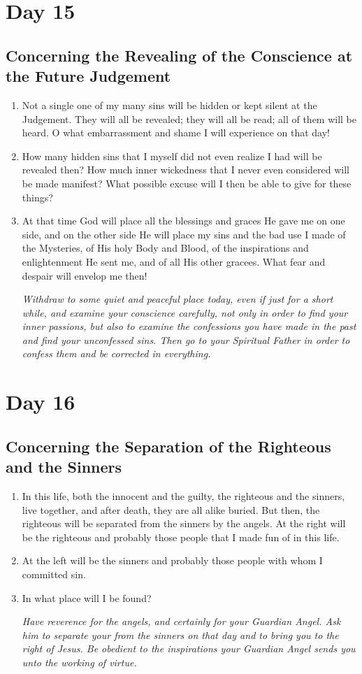 \documentclass[11pt]{article}
\begin{document}
\section{Day 15}
\label{sec:org149ba30}
\subsection{Concerning the Revealing of the Conscience at the Future Judgement}
\label{sec:org495d395}
\begin{enumerate}
\item Not a single one of my many sins will be hidden or kept silent at the Judgement. They will all be revealed; they will all be read; all of them will be heard. O what embarrassment and shame I will experience on that day!
\item How many hidden sins that I myself did not even realize I had will be revealed then? How much inner wickedness that I never even considered will be made manifest? What possible excuse will I then be able to give for these things?
\item At that time God will place all the blessings and graces He gave me on one side, and on the other side He will place my sins and the bad use I made of the Mysteries, of His holy Body and Blood, of the inspirations and enlightenment He sent me, and of all His other gracees. What fear and despair will envelop me then!

\emph{Withdraw to some quiet and peaceful place today, even if just for a short while, and examine your conscience carefully, not only in order to find your inner passions, but also to examine the confessions you have made in the past and find your unconfessed sins. Then go to your Spiritual Father in order to confess them and be corrected in everything.}
\end{enumerate}
\section{Day 16}
\label{sec:org80a8b3d}
\subsection{Concerning the Separation of the Righteous and the Sinners}
\label{sec:orgd5c5962}
\begin{enumerate}
\item In this life, both the innocent and the guilty, the righteous and the sinners, live together, and after death, they are all alike buried. But then, the righteous will be separated from the sinners by the angels. At the right will be the righteous and probably those people that I made fun of in this life.
\item At the left will be the sinners and probably those people with whom I committed sin.
\item In what place will I be found?

\emph{Have reverence for the angels, and certainly for your Guardian Angel. Ask him to separate your from the sinners on that day and to bring you to the right of Jesus. Be obedient to the inspirations your Guardian Angel sends you unto the working of virtue.}
\end{enumerate}
\end{document}
